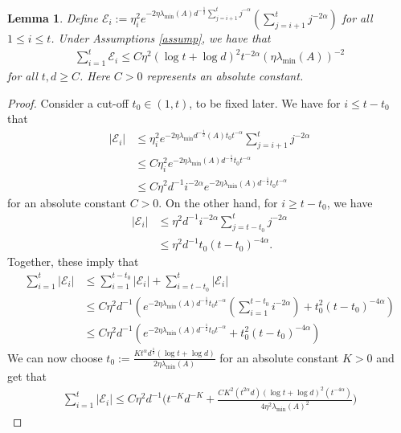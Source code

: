 \documentclass[11pt, reqno,english]{amsart}
\newtheorem{lemma}{Lemma}[section]
\begin{document}
\begin{lemma}\label{variance-error-control}
Define $\mathcal E_i := \eta^2_ie^{-2\eta \lambda_{\min}(A) d^{-\frac{1}{2}}\sum_{j = i+1}^t j^{-\alpha}}(\sum_{j = i+1}^tj^{-2\alpha})$ for all $1 \leq i \leq t$. Under Assumptions \ref{assump}, we have that
\begin{align*}
    \sum_{i = 1}^t \mathcal E_i \leq C\eta^2(\log t + \log d)^2 t^{-2\alpha} (\eta\lambda_{\min}(A))^{-2}
\end{align*}
for all $t, d \geq C$. Here $C > 0$ represents an absolute constant. 
\end{lemma}
\begin{proof}
Consider a cut-off $t_0 \in (1, t)$, to be fixed later. We have for $i\leq t-t_0$ that
\begin{align*}
|\mathcal E_i| &\leq \eta^2_ie^{-2\eta \lambda_{\min}d^{-\frac{1}{2}}(A)t_0 t^{-\alpha}}\sum_{j = i+1}^t j^{-2\alpha}
\\
&\leq C\eta^2_ie^{-2\eta \lambda_{\min}(A) d^{-\frac{1}{2}}t_0t^{-\alpha}}
\\
&\leq C\eta^2d^{-1} i^{-2\alpha}e^{-2\eta \lambda_{\min}(A) d^{-\frac{1}{2}}t_0t^{-\alpha}}
\end{align*}
for an absolute constant $C > 0$. On the other hand, for $i \geq t-t_0$, we have
\begin{align*}
|\mathcal E_i| &\leq \eta^2 d^{-1}i^{-2\alpha}\sum_{j = t-t_0}^t j^{-2\alpha}
\\
&\leq \eta^2 d^{-1}t_0(t - t_0)^{-4\alpha}.
\end{align*}
Together, these imply that
\begin{align*}
\sum_{i = 1}^t |\mathcal E_i| &\leq \sum_{i = 1}^{t-t_0}|\mathcal E_i| + \sum_{i = t-t_0}^t |\mathcal E_i|
\\
&\leq C\eta^2d^{-1}(e^{-2\eta \lambda_{\min}(A)d^{-\frac{1}{2}}t_0t^{-\alpha}}(\sum_{i  = 1}^{t-t_0}i^{-2\alpha}) + t_0^2(t  - t_0)^{-4\alpha})
\\
&\leq C\eta^2d^{-1}(e^{-2\eta \lambda_{\min}(A)d^{-\frac{1}{2}}t_0t^{-\alpha}} + t_0^2(t  - t_0)^{-4\alpha})
\end{align*}
We can now choose $t_0 := \frac{K t^{\alpha} d^{\frac{1}{2}}(\log t + \log d)}{2\eta \lambda_{\min}(A)}$ for an absolute constant $K >0$ and get that
\begin{align*}
    \sum_{i = 1}^t |\mathcal E_i| \leq C\eta^2d^{-1}\bigg(t^{-K}d^{-K} + \frac{CK^2(t^{2\alpha}d)(\log t + \log d)^2(t^{-4\alpha})}{4\eta^2 \lambda_{\min}(A)^2}\bigg)
\end{align*}

\end{proof}
\end{document}
